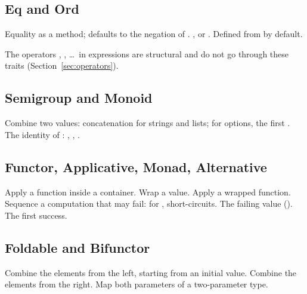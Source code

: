 \subsection{Eq and Ord}
\begin{siglist}
 Equality as a method;
\tc{(!=)} defaults to the negation of \tc{(==)}.
 ,  or .
 Defined from
 by default.
\end{siglist}
\noindent The operators \tc{==}, \tc{<}, \dots\ in expressions are
structural and do not go through these traits (Section~\ref{sec:operators}).

\subsection{Semigroup and Monoid}
\begin{siglist}
 Combine two values:
concatenation for strings and lists; for options, the first .
 The identity of : ,
\tc{[]}, .
\end{siglist}

\subsection{Functor, Applicative, Monad, Alternative}
\begin{siglist}
 Apply a function inside a
container.
 Wrap a value.
 Apply a wrapped function.
 Sequence a
computation that may fail: for ,  short-circuits.
 The failing value ().
 The first success.
\end{siglist}

\subsection{Foldable and Bifunctor}
\begin{siglist}
 Combine the
elements from the left, starting from an initial value.
 Combine the
elements from the right.
 Map
both parameters of a two-parameter type.
\end{siglist}

